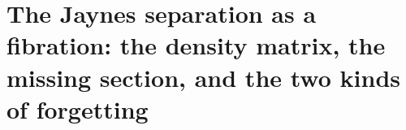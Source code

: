 %
%

\section{The Jaynes separation as a fibration: the density matrix, the
  missing section, and the two kinds of forgetting}
\label{app:jaynes}

